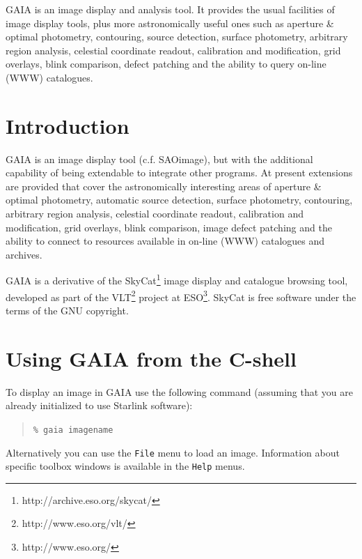 \documentclass[twoside,11pt]{article}
\newcommand{\stardocinitials}  {SUN}
\newcommand{\stardocnumber}    {214.7}
\newcommand{\stardocabstract} {GAIA is an image display and analysis
tool. It provides the usual facilities of image display tools, plus
more astronomically useful ones such as aperture \& optimal
photometry, contouring, source detection, surface photometry,
arbitrary region analysis, celestial coordinate readout, calibration
and modification, grid overlays, blink comparison, defect patching and
the ability to query on-line (WWW) catalogues.}
\newcommand{\stardocname}{\stardocinitials /\stardocnumber}
\newcommand{\htmladdnormallinkfoot}[2]{#1\footnote{#2}}
\newenvironment{latexonly}{}{}
\newcommand{\xlabel}[1]{}
\renewcommand{\_}{\texttt{\symbol{95}}}
\newcommand{\mytt}[1]{{\tt{#1}}}
\renewcommand{\thepage}{\roman{page}}
\begin{document}
\stardocabstract
  \newpage
  \begin{latexonly}
    \setlength{\parskip}{0mm}
    \tableofcontents
    \setlength{\parskip}{\medskipamount}
    \markboth{\stardocname}{\stardocname}
  \end{latexonly}
\cleardoublepage
\renewcommand{\thepage}{\arabic{page}}
\setcounter{page}{1}


\section{Introduction\xlabel{introduction}\label{introduction}}

GAIA is an image display tool (c.f. SAOimage), but with the additional
capability of being extendable to integrate other programs.  At
present extensions are provided that cover the astronomically
interesting areas of aperture \& optimal photometry, automatic source
detection, surface photometry, contouring, arbitrary region
analysis, celestial coordinate readout, calibration and modification,
grid overlays, blink comparison, image defect patching and the ability
to connect to resources available in on-line (WWW) catalogues and
archives.

GAIA is a derivative of the
\htmladdnormallinkfoot{SkyCat}{http://archive.eso.org/skycat/} image
display and catalogue browsing tool, developed as part of the
\htmladdnormallinkfoot{VLT}{http://www.eso.org/vlt/} project at
\htmladdnormallinkfoot{ESO}{http://www.eso.org/}. SkyCat is free software
under the terms of the GNU copyright.

\section{\xlabel{using_gaia_from_the_cshell}Using GAIA from the C-shell}

To display an image in GAIA use the following command
(assuming that you are already initialized to use Starlink software):
\begin{quote}
\mytt{\% gaia image\_name}
\end{quote}
Alternatively you can use the \mytt{File} menu to load an image.
Information about specific toolbox windows is available in the
\mytt{Help} menus.
\end{document}
